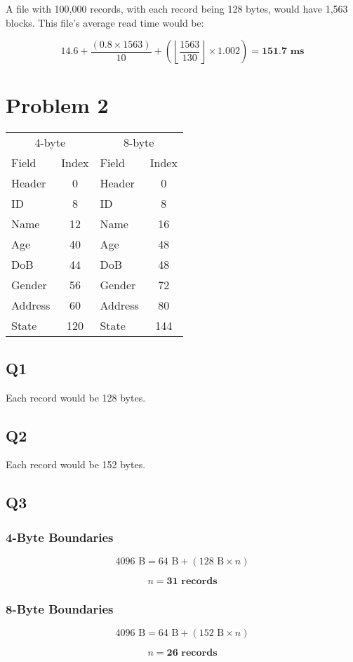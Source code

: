 \documentclass[a4paper, 12pt]{article}
\begin{document}
A file with 100,000 records, with each record being 128 bytes, would have 1,563
blocks. This file's average read time would be:

\[ 14.6 + \frac{(0.8 \times 1563)}{10} + \left ( \left
						\lfloor{\frac{1563}{130}}\right \rfloor \times 1.002
		\right ) = \textbf{151.7 ms} \]

\section*{Problem 2}

\begin{table}[h]
	\centering
	\begin{tabular}{ l c | l c }
		\multicolumn{2}{c}{4-byte} &
		\multicolumn{2}{c}{8-byte} \\

		Field & Index & Field & Index \\
		
		\hline
	
		Header & 0 & Header & 0\\
		ID & 8 & ID & 8 \\
		Name & 12 & Name & 16 \\
		Age & 40 & Age & 48 \\
		DoB & 44 & DoB & 48 \\
		Gender & 56 & Gender & 72 \\
		Address & 60 & Address & 80 \\
		State & 120 & State & 144
	\end{tabular}
\end{table}

\subsection*{Q1}

Each record would be 128 bytes.

\subsection*{Q2}

Each record would be 152 bytes.

\subsection*{Q3}

\subsubsection*{4-Byte Boundaries}

\[ 4096 \text{ B} = 64 \text{ B} + ( 128 \text{ B} \times n ) \]

\[ n = \textbf{31 records} \]

\subsubsection*{8-Byte Boundaries}

\[ 4096 \text{ B} = 64 \text{ B} + ( 152 \text{ B} \times n ) \]

\[ n = \textbf{26 records} \]
\end{document}
